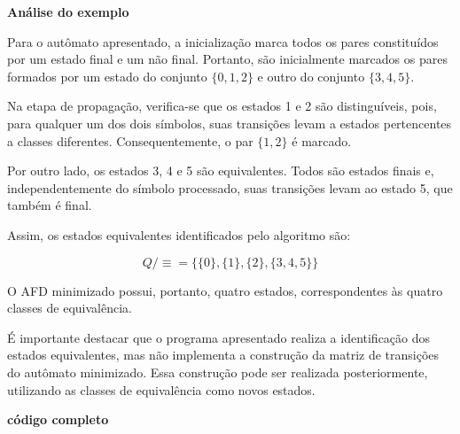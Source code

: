 \documentclass[
  brazilian,
  letterpaper,
]{book}
\theoremstyle{plain}
\theoremstyle{definition}
\theoremstyle{remark}
\begin{document}
\textbf{Análise do exemplo}

Para o autômato apresentado, a inicialização marca todos os pares
constituídos por um estado final e um não final. Portanto, são
inicialmente marcados os pares formados por um estado do conjunto
\(\{0,1,2\}\) e outro do conjunto \(\{3,4,5\}\).

Na etapa de propagação, verifica-se que os estados 1 e 2 são
distinguíveis, pois, para qualquer um dos dois símbolos, suas transições
levam a estados pertencentes a classes diferentes. Consequentemente, o
par \(\{1,2\}\) é marcado.

Por outro lado, os estados 3, 4 e 5 são equivalentes. Todos são estados
finais e, independentemente do símbolo processado, suas transições levam
ao estado 5, que também é final.

Assim, os estados equivalentes identificados pelo algoritmo são:

\[
Q/{\equiv} =
\{\{0\},\{1\},\{2\},\{3,4,5\}\}
\]

O AFD minimizado possui, portanto, quatro estados, correspondentes às
quatro classes de equivalência.

É importante destacar que o programa apresentado realiza a identificação
dos estados equivalentes, mas não implementa a construção da matriz de
transições do autômato minimizado. Essa construção pode ser realizada
posteriormente, utilizando as classes de equivalência como novos
estados.

\textbf{código completo}
\end{document}
